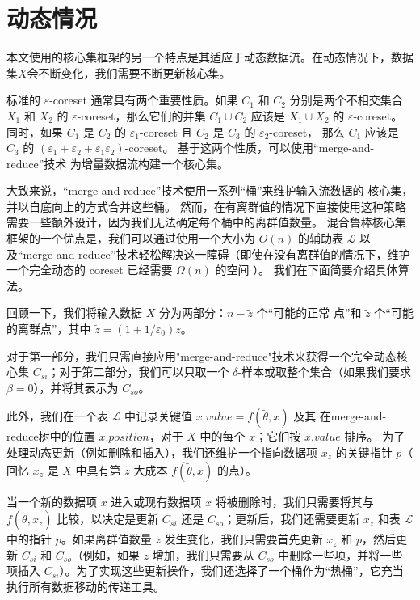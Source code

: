 \section{动态情况}

本文使用的核心集框架的另一个特点是其适应于动态数据流。在动态情况下，数据集$X$会不断变化，我们需要不断更新核心集。

标准的 $\varepsilon$-coreset 通常具有两个重要性质。如果 $C_1$ 和 $C_2$ 分别是两个不相交集合 $X_1$ 
和 $X_2$ 的 $\varepsilon$-coreset，那么它们的并集 $C_1 \cup C_2$ 应该是 $X_1 \cup X_2$ 的 $\varepsilon$-coreset。
同时，如果 $C_1$ 是 $C_2$ 的 $\varepsilon_1$-coreset 且 $C_2$ 是 $C_3$ 的 $\varepsilon_2$-coreset，
那么 $C_1$ 应该是 $C_3$ 的 $(\varepsilon_1 + \varepsilon_2 + \varepsilon_1 \varepsilon_2)$-coreset。
基于这两个性质，可以使用“merge-and-reduce”技术 \citep{DBLP:conf/stoc/Har-PeledM04,DBLP:conf/esa/HenzingerK20} 为增量数据流构建一个核心集。


大致来说，“merge-and-reduce”技术使用一系列“桶”来维护输入流数据的 核心集，并以自底向上的方式合并这些桶。
然而，在有离群值的情况下直接使用这种策略需要一些额外设计，因为我们无法确定每个桶中的离群值数量。
混合鲁棒核心集框架的一个优点是，我们可以通过使用一个大小为 $O(n)$ 的辅助表 $\mathcal{L}$ 
以及“merge-and-reduce”技术轻松解决这一障碍（即使在没有离群值的情况下，维护一个完全动态的 coreset 已经需要 $\Omega(n)$ 的空间 \cite{DBLP:conf/esa/HenzingerK20}）。
我们在下面简要介绍具体算法。

回顾一下，我们将输入数据 $X$ 分为两部分：$n - \tilde{z}$ 个“可能的正常
点”和 $\tilde{z}$ 个“可能的离群点”，其中 $\tilde{z} = (1 + 1/\varepsilon_0)z$。

对于第一部分，我们只需直接应用"merge-and-reduce"技术来获得一个完全动态核心集 $C_{si}$；对于第二部分，我们可以只取一个 $\delta$-样本或取整个集合（如果我们要求 $\beta = 0$），并将其表示为 $C_{so}$。

此外，我们在一个表 $\mathcal{L}$ 中记录关键值 $x.value = f(\tilde{\theta}, x)$ 及其
在merge-and-reduce树中的位置 $x.position$，对于 $X$ 中的每个 $x$；它们按 $x.value$ 排序。
为了处理动态更新（例如删除和插入），我们还维护一个指向数据项 $x_z$ 的关键指针 $p$（
回忆 $x_z$ 是 $X$ 中具有第 $\tilde{z}$ 大成本 $f(\tilde{\theta}, x)$ 的点）。

当一个新的数据项 $x$ 进入或现有数据项 $x$ 将被删除时，我们只需要将其与 $f(\tilde{\theta}, x_z)$ 比较，以决定是更新 $C_{si}$ 还是 $C_{so}$；更新后，我们还需要更新 $x_z$ 和表 $\mathcal{L}$ 中的指针 $p$。如果离群值数量 $z$ 发生变化，我们只需要首先更新 $x_z$ 和 $p$，然后更新 $C_{si}$ 和 $C_{so}$（例如，如果 $z$ 增加，我们只需要从 $C_{so}$ 中删除一些项，并将一些项插入 $C_{si}$）。为了实现这些更新操作，我们还选择了一个桶作为“热桶”，它充当执行所有数据移动的传递工具。

